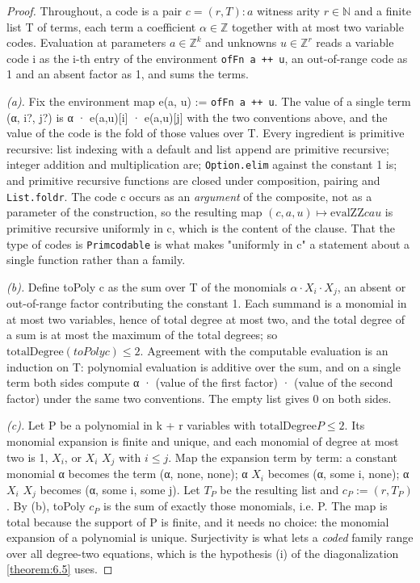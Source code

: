 \begin{proof}
Throughout, a code is a pair $c = (r, T): a$ witness arity $r ∈ ℕ$ and a finite list T of terms, each term a coefficient $α ∈ ℤ$ together with at most two variable codes. Evaluation at parameters $a ∈ ℤ^{k}$ and unknowns $u ∈ ℤ^{r}$ reads a variable code i as the i-th entry of the environment \texttt{ofFn a ++ u}, an out-of-range code as 1 and an absent factor as 1, and sums the terms.

\emph{(a).} Fix the environment map e(a, u) := \texttt{ofFn a ++ u}. The value of a single term (α, i?, j?) is α · e(a,u)[i] · e(a,u)[j] with the two conventions above, and the value of the code is the fold of those values over T. Every ingredient is primitive recursive: list indexing with a default and list append are primitive recursive; integer addition and multiplication are; \texttt{Option.\allowbreak{}elim} against the constant 1 is; and primitive recursive functions are closed under composition, pairing and \texttt{List.\allowbreak{}foldr}. The code c occurs as an \emph{argument} of the composite, not as a parameter of the construction, so the resulting map $(c, a, u) ↦ \mathrm{evalZZ} c a u$ is primitive recursive uniformly in c, which is the content of the clause. That the type of codes is \texttt{Primcodable} is what makes "uniformly in c" a statement about a single function rather than a family.

\emph{(b).} Define toPoly c as the sum over T of the monomials $α·X_{i}·X_{j}$, an absent or out-of-range factor contributing the constant 1. Each summand is a monomial in at most two variables, hence of total degree at most two, and the total degree of a sum is at most the maximum of the total degrees; so $\mathrm{totalDegree} (toPoly c) ≤ 2$. Agreement with the computable evaluation is an induction on T: polynomial evaluation is additive over the sum, and on a single term both sides compute α · (value of the first factor) · (value of the second factor) under the same two conventions. The empty list gives 0 on both sides.

\emph{(c).} Let P be a polynomial in k + r variables with $\mathrm{totalDegree} P ≤ 2$. Its monomial expansion is finite and unique, and each monomial of degree at most two is 1, $X_{i}$, or $X_{i}$ $X_{j}$ with $i ≤ j$. Map the expansion term by term: a constant monomial α becomes the term (α, none, none); α $X_{i}$ becomes (α, some i, none); α $X_{i}$ $X_{j}$ becomes (α, some i, some j). Let $T_{P}$ be the resulting list and $c_{P} := (r, T_{P})$. By (b), toPoly $c_{P}$ is the sum of exactly those monomials, i.e. P. The map is total because the support of P is finite, and it needs no choice: the monomial expansion of a polynomial is unique. Surjectivity is what lets a \emph{coded} family range over all degree-two equations, which is the hypothesis (i) of the diagonalization \cref{theorem:6.5} uses.


\end{proof}
